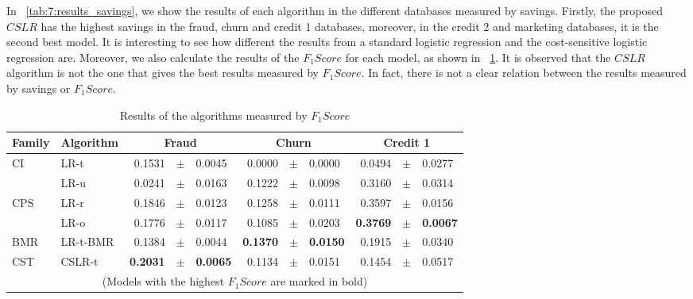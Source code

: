 In \tablename{~\ref{tab:7:results_savings}}, we show the results of each algorithm in the different 
databases measured by savings. Firstly, the proposed $CSLR$ has the highest savings in the 
fraud, churn and credit 1 databases, moreover, in the credit 2 and marketing databases, it 
is the second best model. It is interesting to see how different the results from a standard 
logistic regression and the cost-sensitive logistic 
regression are. Moreover, we also calculate the results of the $F_1Score$ for each model, as 
shown in \tablename{~\ref{tab:7:results_fscore}}. It is observed that the $CSLR$ algorithm is not 
the one that gives the best results measured by $F_1Score$. In fact, there is not a clear relation 
between the results measured by savings or  $F_1Score$.

\begin{table}
    \centering
    \footnotesize
    \begin{tabular}{l l r@{\hskip 0in}c@{\hskip 0in}l r@{\hskip 0in}c@{\hskip 0in}l r@{\hskip 
    0in}c@{\hskip 0in}l  } %
    \hline
    \bf{Family} & \bf{Algorithm} & \multicolumn{3}{c}{\bf{Fraud}} & 
    \multicolumn{3}{c}{\bf{Churn}} & \multicolumn{3}{c}{\bf{Credit 1}} \\ 
    \hline
CI&LR-t & 0.1531 &$\pm$& 0.0045 & 0.0000 &$\pm$& 0.0000 & 0.0494 &$\pm$& 0.0277\\ 
&LR-u & 0.0241 &$\pm$& 0.0163 & 0.1222 &$\pm$& 0.0098 & 0.3160 &$\pm$& 0.0314\\ 
\hline 
CPS&LR-r & 0.1846 &$\pm$& 0.0123 & 0.1258 &$\pm$& 0.0111 & 0.3597 &$\pm$& 0.0156\\ 
&LR-o & 0.1776 &$\pm$& 0.0117 & 0.1085 &$\pm$& 0.0203 & \bf{0.3769} &\bf{$\pm$}& \bf{0.0067}\\ 
\hline 
BMR&LR-t-BMR & 0.1384 &$\pm$& 0.0044 & \bf{0.1370} &\bf{$\pm$}& \bf{0.0150} & 0.1915 &$\pm$& 
0.0340\\ 
\hline 
CST&CSLR-t & \bf{0.2031} &\bf{$\pm$}& \bf{0.0065} & 0.1134 &$\pm$& 0.0151 & 0.1454 &$\pm$& 0.0517\\ 
\hline
  \multicolumn{11}{c}{(Models with the highest $F_1Score$ are marked in bold)}
  \end{tabular}
    \caption{Results of the algorithms measured by $F_1Score$}
    \label{tab:7:results_fscore}
  \end{table}
  
